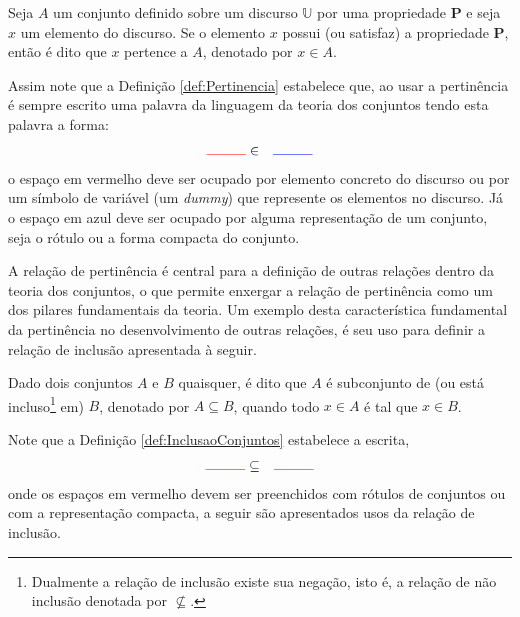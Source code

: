 \begin{definicao}[Pertinência]\label{def:Pertinencia}
  Seja $A$ um conjunto definido sobre um discurso $\mathbb{U}$ por uma propriedade $\textbf{P}$ e seja $x$ um elemento do discurso. Se o elemento $x$ possui (ou satisfaz) a propriedade $\textbf{P}$, então é dito que $x$ pertence a $A$, denotado por $x \in A$.
\end{definicao}

Assim note que a Definição \ref{def:Pertinencia} estabelece que, ao usar a pertinência é sempre escrito uma palavra da linguagem da teoria dos conjuntos tendo esta palavra a forma:
\begin{eqnarray*}
  {\color{red}\rule{1cm}{0.4pt}} & \in & {\color{blue}\rule{1cm}{0.4pt}} 
\end{eqnarray*}
o espaço em {\color{red}vermelho} deve ser ocupado por elemento concreto do discurso ou por um símbolo de variável (um \textit{dummy}) que represente os elementos no discurso. Já o espaço em {\color{blue}azul} deve ser ocupado por alguma representação de um conjunto, seja o rótulo ou a forma compacta do conjunto.

A relação de pertinência é central para a definição de outras relações dentro da teoria dos conjuntos, o que permite enxergar a relação de pertinência como um dos pilares fundamentais da teoria. Um exemplo desta característica fundamental da pertinência no desenvolvimento de outras relações, é seu uso para definir a relação de inclusão apresentada à seguir.

\begin{definicao}\label{def:InclusaoConjuntos}
  \cite{lipschutz1978-TC} Dado dois conjuntos $A$ e $B$ quaisquer, é dito que $A$ é subconjunto de (ou está incluso\footnote{Dualmente a relação de inclusão existe sua negação, isto é, a relação de não inclusão denotada por $\not\subseteq$.} em) $B$, denotado por $A \subseteq B$, quando todo $x \in A$ é tal que $x \in B$.
\end{definicao}

Note que a Definição \ref{def:InclusaoConjuntos} estabelece a escrita,
\begin{eqnarray*}
  {\color{red}\rule{1cm}{0.4pt}} & \subseteq & {\color{red}\rule{1cm}{0.4pt}} 
\end{eqnarray*}
onde os espaços em {\color{red}vermelho} devem ser preenchidos com rótulos de conjuntos ou com a representação compacta, a seguir são apresentados usos da relação de inclusão.

